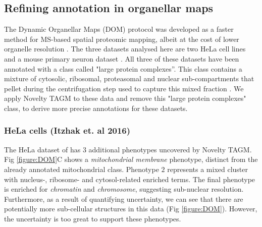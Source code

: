 \documentclass[12pt,english]{article}
\begin{document}
\clearpage
\subsection*{Refining annotation in organellar maps}
The Dynamic Organellar Maps (DOM) protocol was developed as a faster method for MS-based spatial proteomic mapping, albeit at the cost of lower organelle resolution \citep{Itzhak:2016,Gatto::2019}. The three datasets analysed here are two HeLa cell lines \citep{Itzhak:2016, Hirst:2018} and a mouse primary neuron dataset \citep{Itzhak::2017}. All three of these datasets have been annotated with a class called "large protein complexes''. This class contains a mixture of cytosolic, ribosomal, proteasomal and nuclear sub-compartments that pellet during the centrifugation step used to capture this mixed fraction \citep{Itzhak:2016}. We apply Novelty TAGM to these data and remove this "large protein complexes" class, to derive more precise annotations for these datasets. 
\subsubsection*{HeLa cells (Itzhak et. al 2016)}
The HeLa dataset of \cite{Itzhak:2016}  has $3$ additional phenotypes uncovered by Novelty TAGM. Fig \ref{figure:DOM}C shows a \textit{mitochondrial membrane} phenotype, distinct from the already annotated mitochondrial class.
Phenotype $2$ represents a mixed cluster with nucleus-, ribosome- and cytosol-related enriched terms. The final phenotype is enriched for \textit{chromatin} and \textit{chromosome}, suggesting sub-nuclear resolution. Furthermore, as a result of quantifying uncertainty, we can see that there are potentially more sub-cellular structures in this data (Fig \ref{figure:DOM}). However, the uncertainty is too great to support these phenotypes. 

\end{document}
